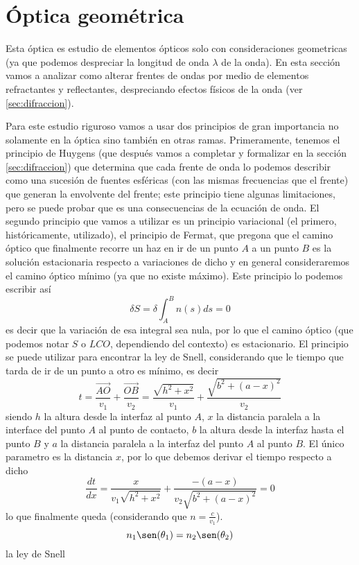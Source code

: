 \documentclass[a4paper]{article}
\numberwithin{equation}{section}
\begin{document}
\section{Óptica geométrica}
		Esta óptica es estudio de elementos ópticos solo con consideraciones geometricas (ya que podemos despreciar la longitud de onda $\lambda$ de la onda). En esta sección vamos a analizar como alterar frentes de ondas por medio de elementos refractantes y reflectantes, despreciando efectos físicos de la onda (ver \ref{sec:difraccion}).
		
		Para este estudio riguroso vamos a usar dos principios de gran importancia no solamente en la óptica sino también en otras ramas. Primeramente, tenemos el principio de Huygens (que después vamos a completar y formalizar en la sección \ref{sec:difraccion}) que determina que cada frente de onda lo podemos describir como una sucesión de fuentes esféricas (con las mismas frecuencias que el frente) que generan la envolvente del frente; este principio tiene algunas limitaciones, pero se puede probar que es una consecuencias de la ecuación de onda. El segundo principio que vamos a utilizar es un principio variacional (el primero, históricamente, utilizado), el principio de Fermat, que pregona que el camino óptico que finalmente recorre un haz en ir de un punto $A$ a un punto $B$ es la solución estacionaria respecto a variaciones de dicho y en general consideraremos el camino óptico mínimo (ya que no existe máximo). Este principio lo podemos escribir así
		\begin{equation}
			\delta S = \delta \int_{A}^{B} n(s) ds = 0
			\label{eq:optica_fermat}
		\end{equation}
		es decir que la variación de esa integral sea nula, por lo que el camino óptico (que podemos notar $S$ o $LCO$, dependiendo del contexto) es estacionario. El principio se puede utilizar para encontrar la ley de Snell, considerando que le tiempo que tarda de ir de un punto a otro es mínimo, es decir \[ t = \frac{\vec{AO}}{v_1} + \frac{\vec{OB}}{v_2} = \frac{\sqrt{h^2+x^2}}{v_1} + \frac{\sqrt{b^2+(a - x)^2}}{v_2}\] siendo $h$ la altura desde la interfaz al punto $A$, $x$ la distancia paralela a la interface del punto $A$ al punto de contacto, $b$ la altura desde la interfaz hasta el punto $B$ y $a$ la distancia paralela a la interfaz del punto $A$ al punto $B$. El único parametro es la distancia $x$, por lo que debemos derivar el tiempo respecto a dicho \[\frac{d t}{d x} = \frac{x}{v_1 \sqrt{h^2 + x^2}} + \frac{ -(a - x)}{v_2 \sqrt{b^2 + (a - x)^2}} = 0\] lo que finalmente queda (considerando que $n = \frac{c}{v_1}$).
		\begin{equation}
			n_1 \sen(\theta_1) = n_2 \sen(\theta_2)
			\label{eq:snell}
		\end{equation}
		la ley de Snell
	
\end{document}

